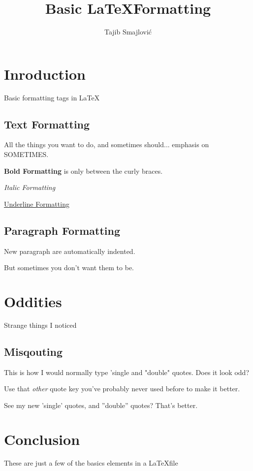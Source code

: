 \documentclass{article}
\title{Basic \LaTeX Formatting}
\author{Tajib Smajlović}
\date{}
\begin{document}
	\maketitle
	
	\section{Inroduction}
	Basic formatting tags in \LaTeX
	
	\subsection{Text Formatting}
	All the things you want to do, and sometimes should... emphasis on SOMETIMES.
	
	\textbf{Bold Formatting} is only between the curly braces.
	
	\emph{Italic Formatting}
	
	\underline{Underline Formatting}
	
	\subsection{Paragraph Formatting}
	New paragraph are automatically indented.
	
	\noindent But sometimes you don't want them to be.
	
	\section{Oddities}
	Strange things I noticed
	
	\subsection{Misqouting}
	This is how I would normally type 'single and "double" quotes. Does it look odd?
	
	\noindent Use that \emph{other} quote key you've probably never used before to make it better.
	
	\noindent See my new 'single' quotes, and ''double'' quotes? That's better.
	
	\section{Conclusion}
	These are just a few of the basics elements in a \LaTeX file
	
\end{document}
